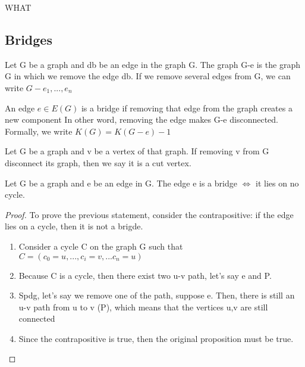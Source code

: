 \documentclass{article}
\begin{document}
\begin{theorem}
    WHAT
\end{theorem}

\subsection{Bridges}%
\label{sub:Bridges}

\begin{definition}
    Let G be a graph and db be an edge in the graph G. The graph G-e is
    the graph G in which we remove the edge db. If we remove several
    edges from G, we can write $G-{e_1, ..., e_n}$
\end{definition}

\begin{definition}[Bridge]
    An edge $e \in E(G)$ is a bridge if removing that edge from the
    graph creates a new component In other word, removing the edge makes
    G-e disconnected. Formally, we write $ K(G) = K(G-e)-1$
\end{definition}

\begin{definition}
    Let G be a graph and v be a vertex of that graph. If removing v from G
    disconnect its graph, then we say it is a cut vertex.
\end{definition}

\begin{theorem}
    Let G be a graph and e be an edge in G. The edge e is a bridge
    $\Longleftrightarrow$ it lies on no cycle.
\end{theorem}

\begin{proof}
    To prove the previous statement, consider the contrapositive:
    if the edge lies on a cycle, then it is not a brigde.
    \begin{enumerate}
	\item Consider a cycle C on the graph G such that $C=(c_0 = u, ...,
	    c_i=v, ... c_n=u)$
	\item Because C is a cycle, then there exist two u-v path, let's
	    say e and P.
	\item Spdg, let's say we remove one of the path, suppose e. Then,
	    there is still an u-v path from u to v (P), which means that
	    the vertices u,v are still connected
	\item Since the contrapositive is true, then the original proposition
	    must be true.
    \end{enumerate}
\end{proof}
\end{document}
